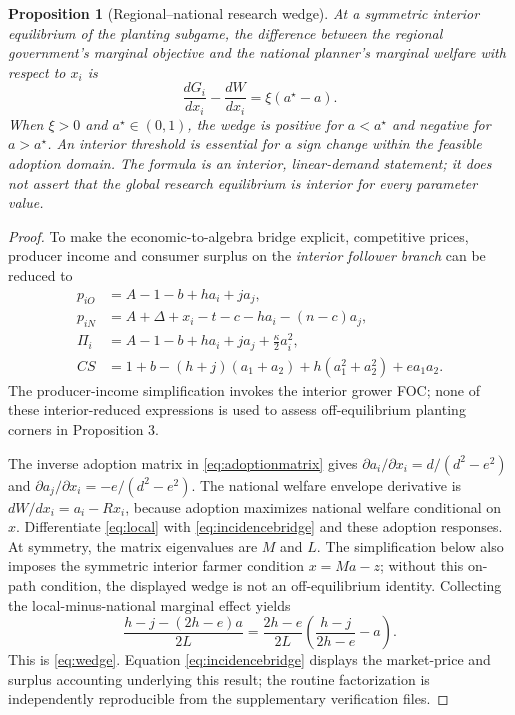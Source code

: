 \documentclass[USenglish]{article}
\newtheorem{proposition}{Proposition}
\begin{document}
\begin{proposition}[Regional--national research wedge]
At a symmetric interior equilibrium of the planting subgame, the difference between the regional government's marginal objective and the national planner's marginal welfare with respect to $x_i$ is
\begin{equation}
 \frac{dG_i}{dx_i}-\frac{dW}{dx_i}=\xi(a^\star-a).
 \label{eq:wedge}
\end{equation}
When $\xi>0$ and $a^\star\in(0,1)$, the wedge is positive for $a<a^\star$ and negative for $a>a^\star$. An interior threshold is essential for a sign change within the feasible adoption domain. The formula is an interior, linear-demand statement; it does not assert that the global research equilibrium is interior for every parameter value.
\end{proposition}
\begin{proof}
To make the economic-to-algebra bridge explicit, competitive prices, producer income and consumer surplus on the \emph{interior follower branch} can be reduced to
\begin{align}
p_{iO}&=A-1-b+h a_i+j a_j,\nonumber\\
p_{iN}&=A+\Delta+x_i-t-c-h a_i-(n-c)a_j,\nonumber\\
\Pi_i&=A-1-b+h a_i+j a_j+\frac{\kappa}{2}a_i^2,\nonumber\\
CS&=1+b-(h+j)(a_1+a_2)
+h(a_1^2+a_2^2)+e a_1a_2.
\label{eq:incidencebridge}
\end{align}
The producer-income simplification invokes the interior grower FOC; none of these interior-reduced expressions is used to assess off-equilibrium planting corners in Proposition 3.

The inverse adoption matrix in \eqref{eq:adoptionmatrix} gives $\partial a_i/\partial x_i=d/(d^2-e^2)$ and $\partial a_j/\partial x_i=-e/(d^2-e^2)$. The national welfare envelope derivative is $dW/dx_i=a_i-Rx_i$, because adoption maximizes national welfare conditional on $x$. Differentiate \eqref{eq:local} with \eqref{eq:incidencebridge} and these adoption responses. At symmetry, the matrix eigenvalues are $M$ and $L$. The simplification below also imposes the symmetric interior farmer condition $x=Ma-z$; without this on-path condition, the displayed wedge is not an off-equilibrium identity. Collecting the local-minus-national marginal effect yields
\[
 \frac{h-j-(2h-e)a}{2L}
 =\frac{2h-e}{2L}\left(\frac{h-j}{2h-e}-a\right).
\]
This is \eqref{eq:wedge}. Equation \eqref{eq:incidencebridge} displays the market-price and surplus accounting underlying this result; the routine factorization is independently reproducible from the supplementary verification files.
\end{proof}
\end{document}
